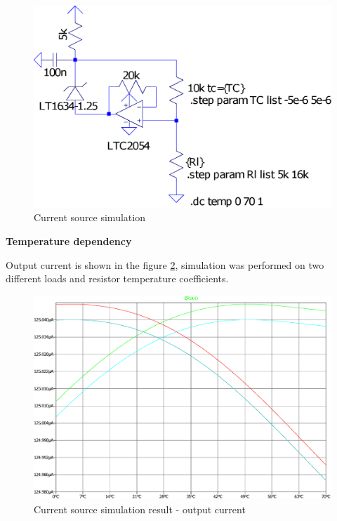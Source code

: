         \begin{figure}[H]
            \centering
            \includegraphics[width=0.6\paperwidth]{img/06/current_source.eps}
            \caption{Current source simulation}
            \label{current_source_simulation}
        \end{figure}

        \bigskip\textbf{Temperature dependency}

        Output current is shown in the figure \ref{current_source_simulation_result}, simulation was performed on two different loads and resistor temperature coefficients.
        \begin{figure}[H]
            \centering
            \includegraphics[width=0.6\paperwidth]{img/06/current_source_result.eps}
            \caption{Current source simulation result - output current}
            \label{current_source_simulation_result}
        \end{figure}

